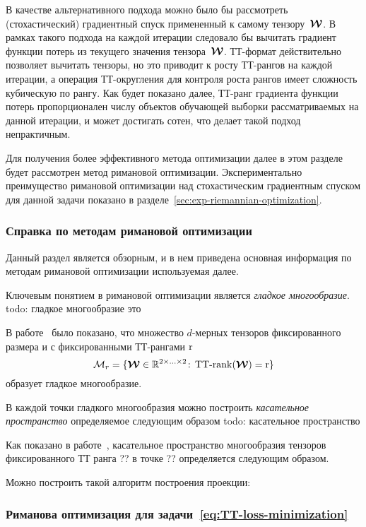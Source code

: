 В качестве альтернативного подхода можно было бы рассмотреть (стохастический) градиентный спуск примененный к самому тензору~$\boldsymbol{\mathcal{W}}$. В рамках такого подхода на каждой итерации следовало бы вычитать градиент функции потерь из текущего значения тензора~$\boldsymbol{\mathcal{W}}$. ТТ-формат действительно позволяет вычитать тензоры, но это приводит к росту ТТ-рангов на каждой итерации, а операция ТТ-округления для контроля роста рангов имеет сложность кубическую по рангу. Как будет показано далее, ТТ-ранг градиента функции потерь пропорционален числу объектов обучающей выборки рассматриваемых на данной итерации, и может достигать сотен, что делает такой подход непрактичным.

Для получения более эффективного метода оптимизации далее в этом разделе будет рассмотрен метод римановой оптимизации.
Экспериментально преимущество римановой оптимизации над стохастическим градиентным спуском для данной задачи показано в разделе~\ref{sec:exp-riemannian-optimization}.

\subsubsection{Справка по методам римановой оптимизации \label{sec:riemannian-help}}
Данный раздел является обзорным, и в нем приведена основная информация по методам римановой оптимизации используемая далее.

Ключевым понятием в римановой оптимизации является \emph{гладкое многообразие}.
\alert{todo: гладкое многообразие это}

В работе~\cite{holtz2012manifolds} было показано, что множество $d$-мерных тензоров фиксированного размера и с фиксированными ТТ-рангами $\operatorname{r}$
\begin{equation*}
\mathcal{M}_r = \{\boldsymbol{\mathcal{W}} \in \mathbb{R}^{2 \times  \ldots \times 2}\!:\, \operatorname{TT-rank}(\boldsymbol{\mathcal{W}})=\operatorname{r}\}
\end{equation*}
образует гладкое многообразие.

В каждой точки гладкого многообразия можно построить \emph{касательное пространство} определяемое следующим образом
\alert{todo: касательное пространство}

Как показано в работе~\cite{??}, касательное пространство многообразия тензоров фиксированного ТТ ранга ?? в точке ?? определяется следующим образом.

Можно построить такой алгоритм построения проекции:

\subsubsection{Риманова оптимизация для задачи~\eqref{eq:TT-loss-minimization} \label{sec:exm-riemannian-optimization}}

